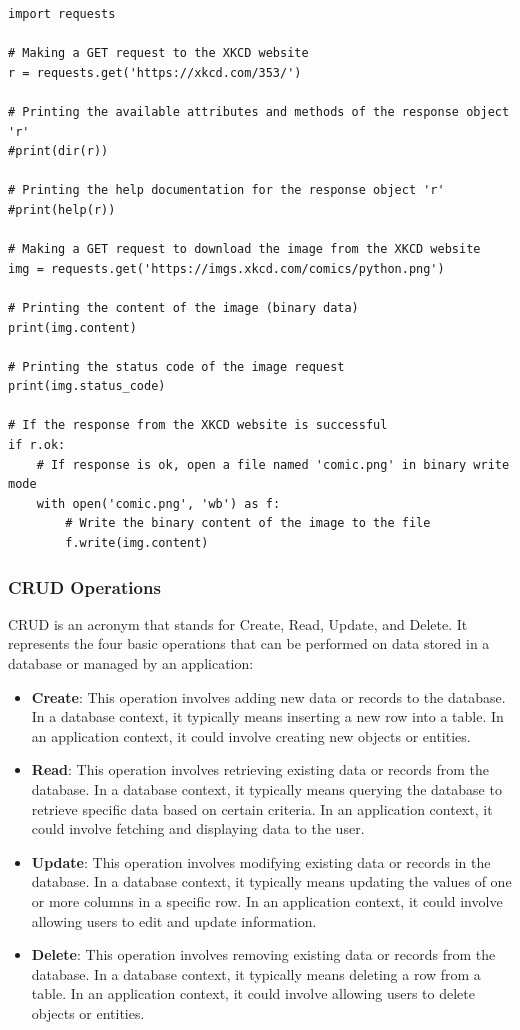 \begin{codebox}
\begin{verbatim}
import requests

# Making a GET request to the XKCD website
r = requests.get('https://xkcd.com/353/')

# Printing the available attributes and methods of the response object 'r'
#print(dir(r))

# Printing the help documentation for the response object 'r'
#print(help(r))

# Making a GET request to download the image from the XKCD website
img = requests.get('https://imgs.xkcd.com/comics/python.png')

# Printing the content of the image (binary data)
print(img.content)

# Printing the status code of the image request
print(img.status_code)

# If the response from the XKCD website is successful
if r.ok:
    # If response is ok, open a file named 'comic.png' in binary write mode
    with open('comic.png', 'wb') as f:
        # Write the binary content of the image to the file
        f.write(img.content)
\end{verbatim}
\end{codebox}

\newpage
\subsubsection{CRUD Operations}
CRUD is an acronym that stands for Create, Read, Update, and Delete. It represents the four basic operations that can be performed on data stored in a database or managed by an application:

\begin{itemize}
    \item \textbf{Create}: This operation involves adding new data or records to the database. In a database context, it typically means inserting a new row into a table. In an application context, it could involve creating new objects or entities.
    
    \item \textbf{Read}: This operation involves retrieving existing data or records from the database. In a database context, it typically means querying the database to retrieve specific data based on certain criteria. In an application context, it could involve fetching and displaying data to the user.
    
    \item \textbf{Update}: This operation involves modifying existing data or records in the database. In a database context, it typically means updating the values of one or more columns in a specific row. In an application context, it could involve allowing users to edit and update information.
    
    \item \textbf{Delete}: This operation involves removing existing data or records from the database. In a database context, it typically means deleting a row from a table. In an application context, it could involve allowing users to delete objects or entities.
\end{itemize}

